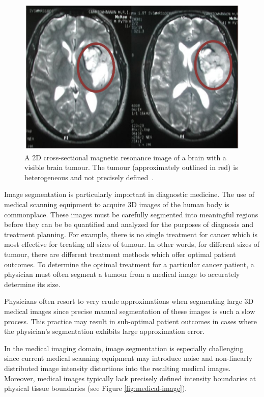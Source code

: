 \begin{figure}[t]
\centering
\includegraphics[width=6.0in]{figures/brain-tumour-with-labels.png}
\caption{A 2D cross-sectional magnetic resonance image of a brain with a visible brain tumour. The tumour (approximately outlined in red) is heterogeneous and not precisely defined~\cite{Botchu-2005}.}
\label{fig:brain-tumour}
\end{figure}
Image segmentation is particularly important in diagnostic medicine. The use of medical scanning equipment to acquire 3D images of the human body is commonplace. These images must be carefully segmented into meaningful regions before they can be be quantified and analyzed for the purposes of diagnosis and treatment planning. For example, there is no single treatment for cancer which is most effective for treating all sizes of tumour. In other words, for different sizes of tumour, there are different treatment methods which offer optimal patient outcomes. To determine the optimal treatment for a particular cancer patient, a physician must often segment a tumour from a medical image to accurately determine its size.

Physicians often resort to very crude approximations when segmenting large 3D medical images since precise manual segmentation of these images is such a slow process. This practice may result in sub-optimal patient outcomes in cases where the physician's segmentation exhibits large approximation error.

In the medical imaging domain, image segmentation is especially challenging since current medical scanning equipment may introduce noise and non-linearly distributed image intensity distortions into the resulting medical images. Moreover, medical images typically lack precisely defined intensity boundaries at physical tissue boundaries (see Figure \ref{fig:medical-image}).

